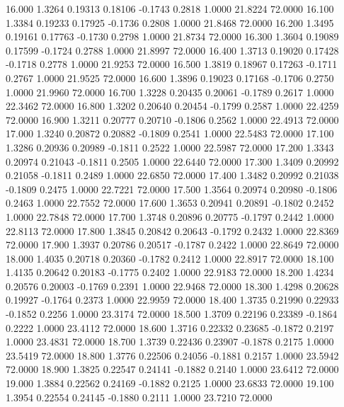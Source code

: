   16.000   1.3264   0.19313   0.18106  -0.1743   0.2818   1.0000  21.8224  72.0000
  16.100   1.3384   0.19233   0.17925  -0.1736   0.2808   1.0000  21.8468  72.0000
  16.200   1.3495   0.19161   0.17763  -0.1730   0.2798   1.0000  21.8734  72.0000
  16.300   1.3604   0.19089   0.17599  -0.1724   0.2788   1.0000  21.8997  72.0000
  16.400   1.3713   0.19020   0.17428  -0.1718   0.2778   1.0000  21.9253  72.0000
  16.500   1.3819   0.18967   0.17263  -0.1711   0.2767   1.0000  21.9525  72.0000
  16.600   1.3896   0.19023   0.17168  -0.1706   0.2750   1.0000  21.9960  72.0000
  16.700   1.3228   0.20435   0.20061  -0.1789   0.2617   1.0000  22.3462  72.0000
  16.800   1.3202   0.20640   0.20454  -0.1799   0.2587   1.0000  22.4259  72.0000
  16.900   1.3211   0.20777   0.20710  -0.1806   0.2562   1.0000  22.4913  72.0000
  17.000   1.3240   0.20872   0.20882  -0.1809   0.2541   1.0000  22.5483  72.0000
  17.100   1.3286   0.20936   0.20989  -0.1811   0.2522   1.0000  22.5987  72.0000
  17.200   1.3343   0.20974   0.21043  -0.1811   0.2505   1.0000  22.6440  72.0000
  17.300   1.3409   0.20992   0.21058  -0.1811   0.2489   1.0000  22.6850  72.0000
  17.400   1.3482   0.20992   0.21038  -0.1809   0.2475   1.0000  22.7221  72.0000
  17.500   1.3564   0.20974   0.20980  -0.1806   0.2463   1.0000  22.7552  72.0000
  17.600   1.3653   0.20941   0.20891  -0.1802   0.2452   1.0000  22.7848  72.0000
  17.700   1.3748   0.20896   0.20775  -0.1797   0.2442   1.0000  22.8113  72.0000
  17.800   1.3845   0.20842   0.20643  -0.1792   0.2432   1.0000  22.8369  72.0000
  17.900   1.3937   0.20786   0.20517  -0.1787   0.2422   1.0000  22.8649  72.0000
  18.000   1.4035   0.20718   0.20360  -0.1782   0.2412   1.0000  22.8917  72.0000
  18.100   1.4135   0.20642   0.20183  -0.1775   0.2402   1.0000  22.9183  72.0000
  18.200   1.4234   0.20576   0.20003  -0.1769   0.2391   1.0000  22.9468  72.0000
  18.300   1.4298   0.20628   0.19927  -0.1764   0.2373   1.0000  22.9959  72.0000
  18.400   1.3735   0.21990   0.22933  -0.1852   0.2256   1.0000  23.3174  72.0000
  18.500   1.3709   0.22196   0.23389  -0.1864   0.2222   1.0000  23.4112  72.0000
  18.600   1.3716   0.22332   0.23685  -0.1872   0.2197   1.0000  23.4831  72.0000
  18.700   1.3739   0.22436   0.23907  -0.1878   0.2175   1.0000  23.5419  72.0000
  18.800   1.3776   0.22506   0.24056  -0.1881   0.2157   1.0000  23.5942  72.0000
  18.900   1.3825   0.22547   0.24141  -0.1882   0.2140   1.0000  23.6412  72.0000
  19.000   1.3884   0.22562   0.24169  -0.1882   0.2125   1.0000  23.6833  72.0000
  19.100   1.3954   0.22554   0.24145  -0.1880   0.2111   1.0000  23.7210  72.0000
